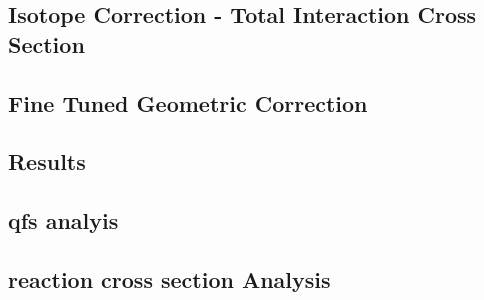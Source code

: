 \subsection{Isotope Correction - Total Interaction Cross Section}
\subsection{Fine Tuned Geometric Correction}
\subsection{Results}
\subsection{qfs analyis}
\subsection{reaction cross section Analysis}

